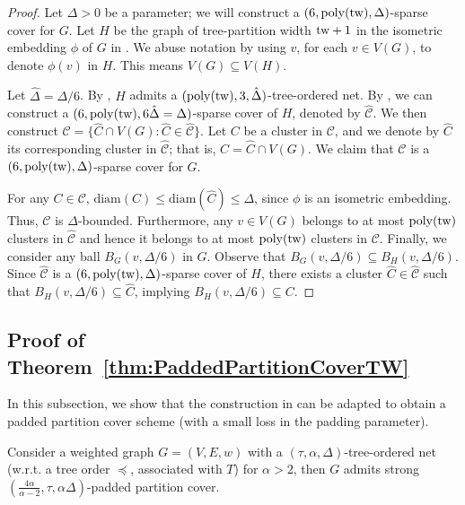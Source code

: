 \documentclass{article}
\newcommand{\tw}{{\rm tw}}
\newcommand{\poly}{\mathrm{poly}}
\newcommand{\diam}{\mathrm{diam}}
\begin{document}
\CoverTWTheorem*
\begin{proof}
Let $\Delta > 0$ be a parameter; we will construct a $(6,\poly(\tw),\Delta)$-sparse cover for $G$. Let $H$ be the graph of tree-partition width $\tw+1$ in the isometric embedding $\phi$ of $G$ in . We abuse notation by using $v$,  for each $v\in V(G)$, to denote $\phi(v)$ in $H$. This means $V(G) \subseteq V(H)$. 

Let $\hat{\Delta} = \Delta/6$. By , $H$ admits a $(\poly(\tw), 3,\hat{\Delta})$-tree-ordered net. By , we can construct a $(6, \poly(\tw), 6\hat{\Delta} = \Delta)$-sparse cover of $H$, denoted by $\hat{\mathcal{C}}$. We then construct $\mathcal{C} = \{\hat{C}\cap V(G): \hat{C}\in \hat{\mathcal{C}}\}$.  Let $C$ be a cluster in $\mathcal{C}$, and we denote by $\hat{C}$ its corresponding cluster in $\hat{\mathcal{C}}$; that is, $C = \hat{C}\cap V(G)$. We claim that $\mathcal{C}$ is  a $(6,\poly(\tw),\Delta)$-sparse cover for $G$.  

For any $C\in \mathcal{C}$, $\diam(C)\leq \diam(\hat{C}) \leq \Delta$, since $\phi$ is an isometric embedding. Thus, $\mathcal{C}$ is $\Delta$-bounded. Furthermore, any $v\in V(G)$ belongs to at most $\poly(\tw)$ clusters in $\mathcal{\hat{C}}$ and hence it belongs to at most  $\poly(\tw)$ clusters  in $\mathcal{C}$. Finally, we consider any ball $B_G(v,\Delta/6)$ in $G$. Observe that $B_G(v,\Delta/6)\subseteq B_H(v,\Delta/6)$. Since $\hat{\mathcal{C}}$ is a $(6, \poly(\tw), \Delta)$-sparse cover of $H$, there exists a cluster $\hat{C} \in \hat{\mathcal{C}}$ such that $B_H(v,\Delta/6)\subseteq \hat{C}$, implying $B_H(v,\Delta/6)\subseteq C$.
\end{proof} 

\subsection{Proof of Theorem~\ref{thm:PaddedPartitionCoverTW}}\label{subsec:PaddedCover}

In this subsection, we show that the construction in  can be adapted to obtain a padded partition cover scheme (with a small loss in the padding parameter).

\begin{lemma}\label{lem:NetToCoverUnionPartitions}
	Consider a weighted graph $G=(V,E,w)$ with a $(\tau,\alpha,\Delta)$-tree-ordered net (w.r.t. a tree order $\preceq$, associated with $T$) for $\alpha>2$, then 
	$G$ admits strong 
	 $(\frac{4\alpha}{\alpha-2},\tau,\alpha\Delta)$-padded partition cover.	
\end{lemma}
\end{document}
